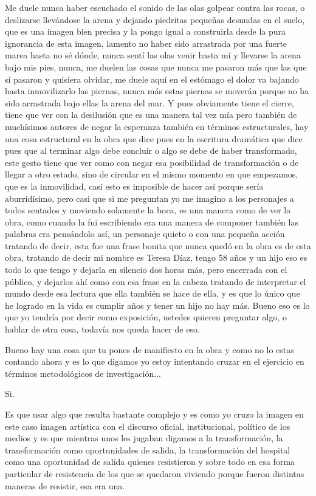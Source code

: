 Me duele nunca haber escuchado el sonido de las olas golpear contra las rocas, o deslizarse llevándose la arena y dejando piedritas pequeñas desnudas en el suelo, que es una imagen bien precisa y la pongo igual a construirla desde la pura ignorancia de esta imagen, lamento no haber sido arrastrada por una fuerte marea hasta no sé dónde, nunca sentí las olas venir hasta mí y llevarse la arena bajo mis pies, nunca, me duelen las cosas que nunca me pasaron más que las que sí pasaron y quisiera olvidar, me duele aquí en el estómago el dolor va bajando hasta inmovilizarlo las piernas, nunca más estas piernas se moverán porque no ha sido arrastrada bajo ellas la arena del mar.
Y pues obviamente tiene el cierre, tiene que ver con la desilusión que es una manera tal vez mía pero también de muchísimos autores de negar la esperanza  también en términos estructurales, hay una cosa estructural en la obra que dice pues en la escritura dramática que dice pues que al terminar algo debe concluir o  algo se debe de haber transformado, este gesto tiene que ver como con negar esa posibilidad de transformación o de llegar a otro estado, sino de circular en el mismo momento en que empezamos, que es la inmovilidad, casi esto es imposible de hacer así porque sería aburridísimo, pero casi que si me preguntan yo me imagino a los personajes a todos sentados y moviendo solamente la boca, es una manera como de ver la obra, como cuando la fui escribiendo era una manera de componer también las palabras era pensándolo así, un personaje quieto o con una pequeña acción tratando de decir, esta fue una frase bonita que nunca quedó en la obra es de esta obra, tratando de decir mi nombre es Teresa Díaz, tengo 58 años y un hijo eso es todo lo que tengo y dejarla en silencio dos horas más, pero encerrada con el público, y dejarlos ahí como con esa frase en la cabeza tratando de interpretar el mundo desde esa lectura que ella también se hace de ella, y es que lo único que he logrado en la vida es cumplir años y tener un hijo no hay más.
Bueno eso es lo que yo tendría por decir como exposición, ustedes quieren preguntar algo, o hablar de otra cosa, todavía nos queda hacer de eso.

Bueno hay una cosa que tu pones de manifiesto en la obra y como no lo estas contando ahora y es lo que digamos yo estoy intentando cruzar en el ejercicio en términos metodológicos de investigación...

Si.

Es que usar algo que resulta bastante complejo y es como yo cruzo la imagen en este caso imagen artística con el discurso oficial, institucional, político de los medios y es que mientras unos les jugaban digamos a la transformación, la transformación como oportunidades de salida, la transformación del hospital como una oportunidad de salida quienes resistieron y sobre todo en esa forma particular de resistencia de los que se quedaron viviendo porque fueron distintas maneras de resistir, esa era una.

